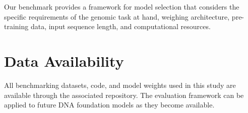 \documentclass[11pt]{article}
\begin{document}
Our benchmark provides a framework for model selection that considers the specific requirements of the genomic task at hand, weighing architecture, pre-training data, input sequence length, and computational resources.

\section{Data Availability}

All benchmarking datasets, code, and model weights used in this study are available through the associated repository. The evaluation framework can be applied to future DNA foundation models as they become available.



\end{document}
